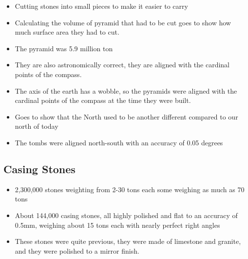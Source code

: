 \documentclass{article}
\begin{document}
\begin{itemize}
  \item Cutting stones into small pieces to make it easier to carry
  \item Calculating the volume of pyramid that had to be
    cut goes to show how much surface area they had to cut.
  \item The pyramid was 5.9 million ton
  \item They are also astronomically correct, they are aligned
    with the cardinal points of the compass.
  \item The axis of the earth has a wobble, so the pyramids
    were aligned with the cardinal points of the compass
    at the time they were built.
  \item Goes to show that the North used to be another different compared
    to our north of today
  \item The tombs were aligned north-south with an accuracy of 0.05 degrees
\end{itemize}

\subsection{Casing Stones}
\begin{itemize}
  \item 2,300,000 stones weighting from 2-30 tons each
    some weighing as much as 70 tons
  \item About 144,000 casing stones, all highly polished and flat to an accuracy of 0.5mm,
    weighing about 15 tons each with
    nearly perfect right angles
  \item These stones were quite previous, they were made of
    limestone and granite, and they were polished to a mirror finish.
\end{itemize}
\end{document}
